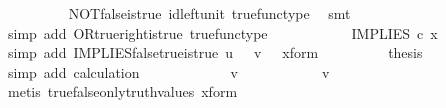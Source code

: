 \begin{isabellebody}
\ \ \ \ \ \ \ \ \isamarkupfalse%
\ NOT{\isacharunderscore}{\kern0pt}false{\isacharunderscore}{\kern0pt}is{\isacharunderscore}{\kern0pt}true\ id{\isacharunderscore}{\kern0pt}left{\isacharunderscore}{\kern0pt}unit{}\ true{\isacharunderscore}{\kern0pt}func{\isacharunderscore}{\kern0pt}type\ \isamarkupfalse%
\ smt\isanewline
\ \ \ \ \ \ \isamarkupfalse%
\ \isamarkupfalse%
\ {\isachardoublequoteopen}{\isachardot}{\kern0pt}{\isachardot}{\kern0pt}{\isachardot}{\kern0pt}\ {\isacharequal}{\kern0pt}\ {\isasymt}{\isachardoublequoteclose}\isanewline
\ \ \ \ \ \ \ \ \isamarkupfalse%
\ {\isacharparenleft}{\kern0pt}simp\ add{\isacharcolon}{\kern0pt}\ OR{\isacharunderscore}{\kern0pt}true{\isacharunderscore}{\kern0pt}right{\isacharunderscore}{\kern0pt}is{\isacharunderscore}{\kern0pt}true\ true{\isacharunderscore}{\kern0pt}func{\isacharunderscore}{\kern0pt}type{\isacharparenright}{\kern0pt}\isanewline
\ \ \ \ \ \ \isamarkupfalse%
\ \isamarkupfalse%
\ {\isachardoublequoteopen}{\isachardot}{\kern0pt}{\isachardot}{\kern0pt}{\isachardot}{\kern0pt}\ {\isacharequal}{\kern0pt}\ IMPLIES\ {\isasymcirc}\isactrlsub c\ x{\isachardoublequoteclose}\isanewline
\ \ \ \ \ \ \ \ \isamarkupfalse%
\ {\isacharparenleft}{\kern0pt}simp\ add{\isacharcolon}{\kern0pt}\ IMPLIES{\isacharunderscore}{\kern0pt}false{\isacharunderscore}{\kern0pt}true{\isacharunderscore}{\kern0pt}is{\isacharunderscore}{\kern0pt}true\ {\isacartoucheopen}u\ {\isacharequal}{\kern0pt}\ {\isasymf}{\isacartoucheclose}\ {\isacartoucheopen}v\ {\isacharequal}{\kern0pt}\ {\isasymt}{\isacartoucheclose}\ x{\isacharunderscore}{\kern0pt}form{\isacharparenright}{\kern0pt}\isanewline
\ \ \ \ \ \ \isamarkupfalse%
\ \isamarkupfalse%
\ {\isacharquery}{\kern0pt}thesis\isanewline
\ \ \ \ \ \ \ \ \isamarkupfalse%
\ {\isacharparenleft}{\kern0pt}simp\ add{\isacharcolon}{\kern0pt}\ calculation{\isacharparenright}{\kern0pt}\isanewline
\ \ \ \ \isamarkupfalse%
\isanewline
\ \ \ \ \ \ \isamarkupfalse%
\ {\isachardoublequoteopen}v\ {\isasymnoteq}\ {\isasymt}{\isachardoublequoteclose}\isanewline
\ \ \ \ \ \ \isamarkupfalse%
\ \isamarkupfalse%
\ {\isachardoublequoteopen}v\ {\isacharequal}{\kern0pt}\ {\isasymf}{\isachardoublequoteclose}\isanewline
\ \ \ \ \ \ \ \ \isamarkupfalse%
\ {\isacharparenleft}{\kern0pt}metis\ true{\isacharunderscore}{\kern0pt}false{\isacharunderscore}{\kern0pt}only{\isacharunderscore}{\kern0pt}truth{\isacharunderscore}{\kern0pt}values\ x{\isacharunderscore}{\kern0pt}form{\isacharparenright}{\kern0pt}\isanewline

\end{isabellebody}
